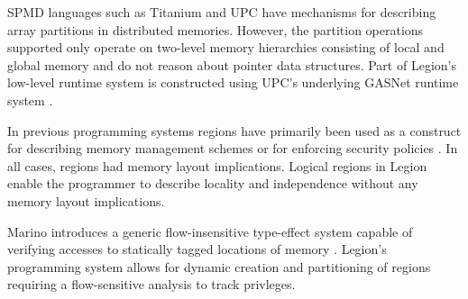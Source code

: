 SPMD languages such as Titanium \cite{JV:Yel98} and UPC \cite{UPC99} have mechanisms for
describing array partitions in distributed memories.  However, the partition
operations supported only operate on two-level memory hierarchies consisting of local
and global memory and do not reason about pointer data structures.  Part of Legion's 
low-level runtime system is constructed using UPC's underlying GASNet 
runtime system \cite{GASNET07}. 

In previous programming systems regions have primarily been used as a construct for
describing memory management schemes \cite{REAPS02}\cite{RC01}  
or for enforcing security policies \cite{CYCLONE01}.  In all cases, regions had
memory layout implications.  Logical regions in Legion enable the programmer to
describe locality and independence without any memory layout implications.

Marino introduces a generic flow-insensitive type-effect system capable of verifying 
accesses to statically tagged locations of memory \cite{PRIVLIGES09}.  Legion's programming
system allows for dynamic creation and partitioning of regions requiring a 
flow-sensitive analysis to track privleges.
